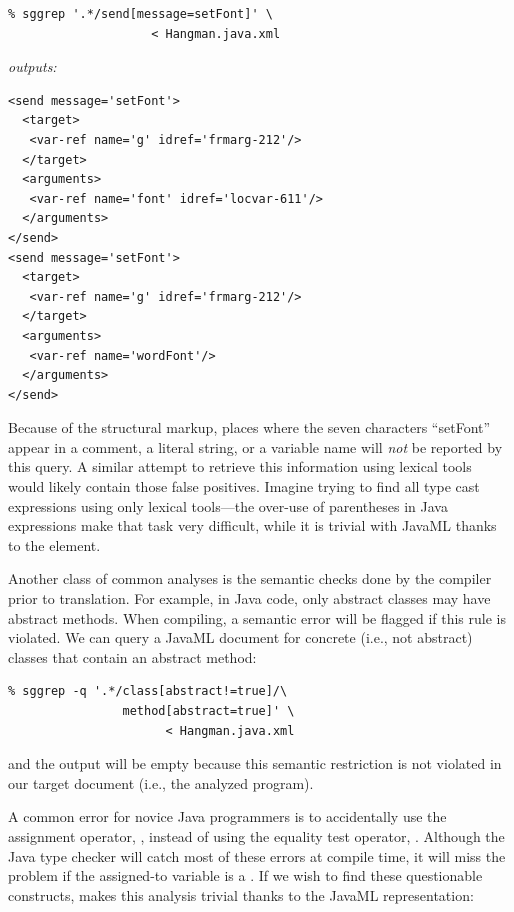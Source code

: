 \documentclass{article}
\begin{document}
\begin{multicols}{2}
\begin{verbatim}
% sggrep '.*/send[message=setFont]' \
                    < Hangman.java.xml 
\end{verbatim}

\noindent\emph{outputs:}
{\small
\begin{verbatim}
<send message='setFont'>
  <target>
   <var-ref name='g' idref='frmarg-212'/>
  </target>
  <arguments>
   <var-ref name='font' idref='locvar-611'/>
  </arguments>
</send>
<send message='setFont'>
  <target>
   <var-ref name='g' idref='frmarg-212'/>
  </target>
  <arguments>
   <var-ref name='wordFont'/>
  </arguments>
</send>
\end{verbatim}
}

\noindent Because of the structural markup, places where the seven characters
``setFont'' appear in a comment, a literal string, or a variable name
will \emph{not} be reported by this query.  A similar attempt to
retrieve this information using lexical tools would likely contain those
false positives.  Imagine trying to find all type cast expressions using 
only lexical tools---the over-use of parentheses in Java expressions
make that task very difficult, while it is trivial with JavaML thanks to 
the  element.

Another class of common analyses is the semantic checks done by the
compiler prior to translation.  For example, in Java code, only abstract
classes may have abstract methods.  When compiling, a semantic error
will be flagged if this rule is violated.  We can query a JavaML document
for concrete (i.e., not abstract) classes that contain an abstract method:

{\small
\begin{verbatim}
% sggrep -q '.*/class[abstract!=true]/\
                method[abstract=true]' \
                      < Hangman.java.xml
\end{verbatim}
}

\noindent and the output will be empty because this semantic restriction is not
violated in our target document (i.e., the analyzed program).

A common error for novice Java programmers is to accidentally use the
assignment operator, \smtexttt{=}, instead of using the equality test
operator, \smtexttt{==}.  Although the Java type checker will catch
most of these errors at compile time, it will miss the problem if
the assigned-to variable is a \smtexttt{boolean}. If we wish to find these
questionable constructs, \smtexttt{sggrep} makes this analysis
trivial thanks to the JavaML representation:


\end{multicols}
\end{document}
